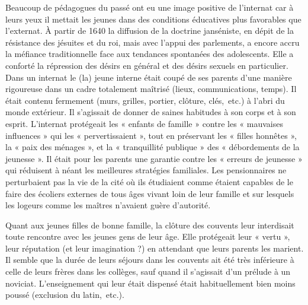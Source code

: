Beaucoup de pédagogues du passé ont eu une image positive de l'internat car à leurs yeux il mettait les jeunes dans des conditions éducatives plus favorables que l'externat. À partir de 1640 la diffusion de la doctrine janséniste, en dépit de la résistance des jésuites et du roi, mais avec l'appui des parlements, a encore accru la méfiance traditionnelle face aux tendances spontanées des adolescents. Elle a conforté la répression des désirs en général et des désirs sexuels en particulier. Dans un internat le (la) jeune interne était coupé de ses parents d'une manière rigoureuse dans un cadre totalement maîtrisé (lieux, communications, temps). Il était contenu fermement (murs, grilles, portier, clôture, clés,~etc.) à l'abri du monde extérieur. Il s'agissait de donner de saines habitudes à son corps et à son esprit.  L'internat protégeait les « enfants de famille » contre les « mauvaises influences » qui les « pervertissaient », tout en préservant les « filles honnêtes », la « paix des ménages », et la « tranquillité publique » des « débordements de la jeunesse ». Il était pour les parents une garantie contre les « erreurs de jeunesse » qui réduisent à néant les meilleures stratégies familiales. Les pensionnaires ne perturbaient pas la vie de la cité où ils étudiaient comme étaient capables de le faire des écoliers externes de tous âges vivant loin de leur famille et sur lesquels les logeurs comme les maîtres n'avaient guère d'autorité. 

Quant aux jeunes filles de bonne famille, la clôture des couvents leur interdisait toute rencontre avec les jeunes gens de leur âge. Elle protégeait leur « vertu », leur réputation (et leur imagination ?) en attendant que leurs parents les marient. Il semble que la durée de leurs séjours dans les couvents ait été très inférieure à celle de leurs frères dans les collèges, sauf quand il s'agissait d'un prélude à un noviciat. L'enseignement qui leur était dispensé était habituellement bien moins poussé (exclusion du latin,~etc.).  

